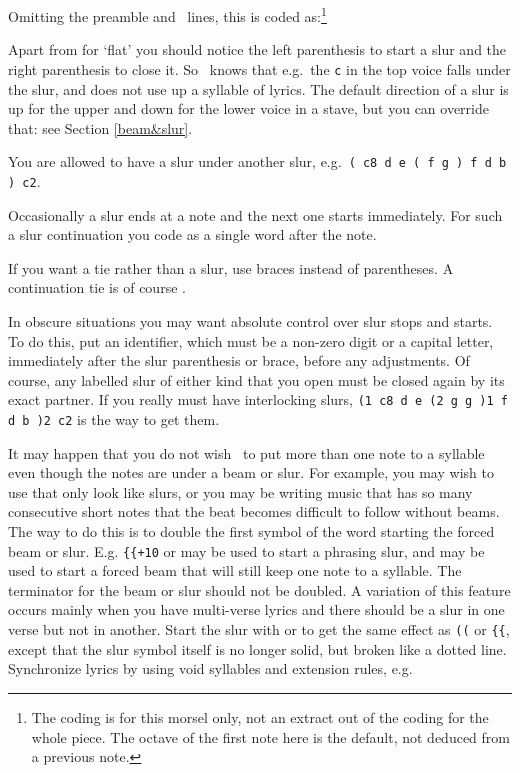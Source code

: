 \documentclass[11pt]{article}
\newcommand{\delete}[1]{\relax}
\begin{document}
\hskip -20mm
\begin{mus}
\small

\end{mus}
Omitting the preamble and \PMX\ lines, this is coded 
as:\footnote{The coding is for this 
morsel only, not an extract out of the coding for the whole piece.  The 
octave of the first note here is the default, not deduced from a 
previous note.} 
 
Apart from  for `\mark flat' you should notice the left 
parenthesis \ttxem{(} to start a slur and the right parenthesis 
\ttxem{)} to close it.  So 
\MTx\ knows that e.g.~the \texttt{c} in the top voice falls under the 
slur, and does not use up a syllable of lyrics.  The default direction
of a slur is up for the upper and down for the lower voice in a stave, 
but you can override that: see Section \ref{beam&slur}.

You are allowed to have a slur under another slur,  
e.g.~\verb"( c8 d e ( f g ) f d b ) c2".

Occasionally a slur ends at a note and the next one starts 
immediately.   For such a slur continuation 
you code \ttxem{)(} as a single word after the note.   

If you want a tie rather than a slur, 
use braces \ixem{\LBR} \ixem{\RBR} instead of parentheses.  
A continuation tie is of course \ixem{\RBR\LBR}.

In obscure situations you may want absolute control over slur stops and
starts.  To do this, put an identifier, which must be a non-zero digit
or a capital letter, immediately after the slur parenthesis or brace,
before any adjustments.  Of course, any labelled slur of either kind
that you open must be closed again by its exact partner.  If you really
must have interlocking slurs,  \verb"(1 c8 d e (2 g g )1 f d b )2 c2"
is the way to get them.  \delete{Labelling slurs in this way is also the only way
of getting more than two levels of slurs.}

It may happen that you do not wish \MTx\ to put more than one note to a 
syllable even though the notes are under a beam or slur.  
For example, you 
may wish to use  that only look like slurs, or you may be 
writing music that has so many consecutive short notes that the beat 
becomes difficult to follow without beams.   The way to do
this is to double the first symbol of the word starting the forced beam
or slur.  E.g.  \verb"{{+10" \index{\LBR\LBR} or \ttxem{((} may be used
to start a phrasing slur, and \ttxem{[[} may be used to start a forced
beam  that will still keep one note to a syllable.
The terminator for the beam or slur should not be doubled.  A variation
of this feature occurs mainly when you have multi-verse lyrics and
 there should be a slur in one verse but not in another.
Start the slur with \ttxem{(\dquote} or \ttxem{\LBR\dquote} to get 
the same effect as  
\verb'((' or \verb'{{', except that the slur symbol itself is no longer
solid, but broken like a dotted line.  
 Synchronize lyrics by using void syllables and extension rules, e.g.
\end{document}
